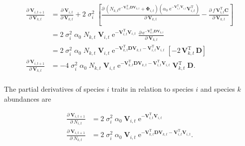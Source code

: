 \begin{equation*}
\begin{split}
    \frac{ \partial \: \mathbf{V}_{i,t+1} }{ \partial \: \mathbf{V}_{k,t} } &=
        \frac{ \partial \: \mathbf{V}_{i,t} }{ \partial \: \mathbf{V}_{k,t} } +
        2 \; \sigma_i^2 \;
        \left[
            \frac{ \partial \:
                \left(
                    N_{k,t} \textrm{e}^{- \mathbf{V}_{k,t}^{\textrm{T}} \mathbf{D}
                    \mathbf{V}_{k,t}} + \mathbf{\Phi}_{i,t}
                \right)
                \left(
                    \alpha_0 \; \textrm{e}^{ - \mathbf{V}_{i,t}^{\textrm{T}}
                    \mathbf{V}_{i,t} } \mathbf{V}_{i,t}^{\textrm{T}}
                \right)
            }{ \partial \:  \mathbf{V}_{k,t} } -
            \frac{ \partial \:  f \, \mathbf{V}_{i,t}^{\textrm{T}} \mathbf{C} }{
            \partial \: \mathbf{V}_{k,t} }
        \right] \\
    &= 2 \; \sigma_i^2 \; \alpha_0 \; N_{k,t} \; \mathbf{V}_{i,t} \;
        \textrm{e}^{ - \mathbf{V}_{i,t}^{\textrm{T}}
        \mathbf{V}_{i,t} } \; 
        \frac{ \partial \:
                \textrm{e}^{
                    - \mathbf{V}_{k,t}^{\textrm{T}} \mathbf{D} \mathbf{V}_{k,t}
                    }
            }{ \partial \:  \mathbf{V}_{k,t} } \\
    &= 2 \; \sigma_i^2 \; \alpha_0 \; N_{k,t} \; \mathbf{V}_{i,t} \;
        \textrm{e}^{
                    - \mathbf{V}_{k,t}^{\textrm{T}} \mathbf{D} \mathbf{V}_{k,t}
                    - \mathbf{V}_{i,t}^{\textrm{T}} \mathbf{V}_{i,t}
                } \;
        \left[ 
            - 2 \, \mathbf{V}_{k,t}^{\textrm{T}} \, \mathbf{D}
        \right] \\
    \frac{ \partial \: \mathbf{V}_{i,t+1} }{ \partial \: \mathbf{V}_{k,t}} &=
        -4 \; \sigma_i^2 \; \alpha_0 \; N_{k,t} \; \mathbf{V}_{i,t} \;
        \textrm{e}^{
                    - \mathbf{V}_{k,t}^{\textrm{T}} \mathbf{D} \mathbf{V}_{k,t}
                    - \mathbf{V}_{i,t}^{\textrm{T}} \mathbf{V}_{i,t}
                } \;
        \mathbf{V}_{k,t}^{\textrm{T}} \; \mathbf{D}
    \textrm{.} \\
\end{split}
\end{equation*}

The partial derivatives of species $i$ traits in relation to species $i$ 
and species $k$ abundances are

\begin{equation*}
\begin{split}
    \frac{ \partial \: \mathbf{V}_{i,t+1} }{ \partial \: N_{i,t} } &=
        2 \; \sigma_i^2 \; \alpha_0 \; \mathbf{V}_{i,t} \;
        \textrm{e}^{ - \mathbf{V}_{i,t}^{\textrm{T}} \mathbf{V}_{i,t} } \\
    \frac{ \partial \: \mathbf{V}_{i,t+1} }{ \partial \: N_{k,t} } &=
        2 \; \sigma_i^2 \; \alpha_0 \; \mathbf{V}_{i,t} \;
        \textrm{e}^{ - \mathbf{V}_{k,t}^{\textrm{T}} \mathbf{D} \mathbf{V}_{k,t}
            - \mathbf{V}_{i,t}^{\textrm{T}} \mathbf{V}_{i,t} }
    \textrm{.} \\
\end{split}
\end{equation*}




